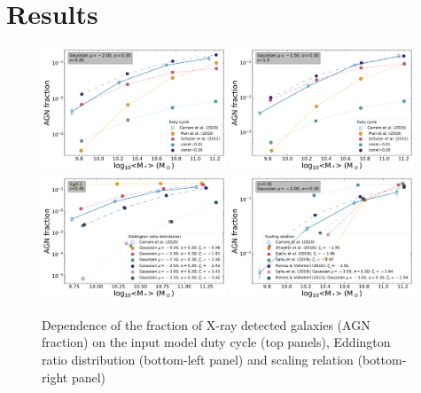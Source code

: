 \section{Results}\label{sec:results}
\begin{figure}
\begin{center}
  \includegraphics[width=0.49\textwidth]{Figs/Chapter3/AGN_fractions_vs_U_mean-2.00_sigma0.3_z0.45.pdf}
  \includegraphics[width=0.49\textwidth]{Figs/Chapter3/AGN_fractions_vs_U_mean-1.50_sigma0.3_z1.0.pdf}
  \includegraphics[width=0.49\textwidth]{Figs/Chapter3/AGN_fractions_EddRatio_U=0.2_z0.45.pdf}
  \includegraphics[width=0.49\textwidth]{Figs/Chapter3/AGN_fractions_ScalRel_comparison_z0.45.pdf}
  \caption{Dependence of the fraction of X-ray detected galaxies (AGN fraction) on the input model duty cycle (top panels),
  Eddington ratio distribution (bottom-left panel) and scaling relation (bottom-right panel)}
    \label{fig:AGN_fractions}
\end{center}
\end{figure}
